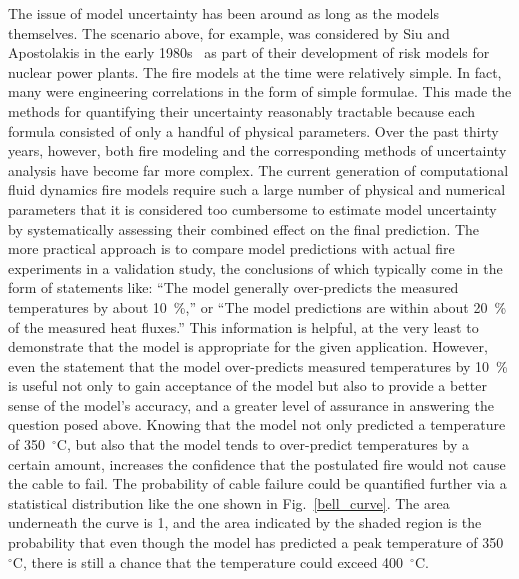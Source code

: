 The issue of model uncertainty has been around as long as the models themselves. The scenario above,
for example, was considered by Siu and Apostolakis in the early 1980s~\cite{Siu:RE1982} as part of their development of risk models for
nuclear power plants. The fire models at the
time were relatively simple. In fact, many were engineering correlations in the form of simple formulae. This made the methods for
quantifying their uncertainty reasonably tractable because each formula consisted of only a handful of physical parameters. Over the past
thirty years, however, both fire modeling and the corresponding methods of uncertainty analysis have become far more complex. The current
generation of computational fluid dynamics fire models require such a large number of physical and numerical parameters that it is considered
too cumbersome to estimate model uncertainty by systematically assessing their combined effect on the final prediction. The more
practical approach is to compare model predictions with actual fire experiments in a validation study, the conclusions of which typically come in the form of statements like:
``The model generally over-predicts the measured temperatures
by about 10~\%,'' or ``The model predictions are within about 20~\% of the measured heat fluxes.'' This information is helpful,
at the very least to demonstrate that the model is appropriate for the given application.
However, even the statement that the model over-predicts measured temperatures by 10~\% is useful not only to gain acceptance of the model but also
to provide a better sense of the model's accuracy, and a greater level of assurance in answering the question posed above. Knowing that the model
not only predicted a temperature of 350~$^\circ$C, but also that the model tends to over-predict temperatures by a certain amount, increases the confidence that
the postulated fire would not cause the cable to fail. The probability of cable failure could be quantified further via a statistical distribution
like the one shown in Fig.~\ref{bell_curve}. The area underneath the curve is 1, and
the area indicated by the shaded region is the probability that even though the model has predicted a peak temperature of 350~$^\circ$C, there is still a chance that
the temperature could exceed 400~$^\circ$C.
